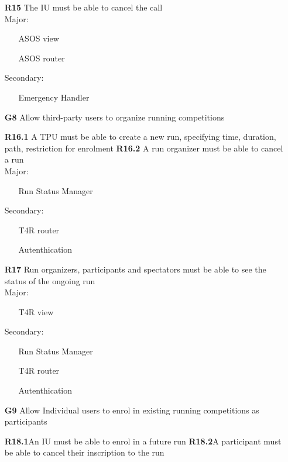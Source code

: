 \begin{itemize}
\subitem \textbf{R15} The IU must be able to cancel the call\\

Major:
\begin{itemize}
\item[\textbullet]ASOS view
\item[\textbullet]ASOS router
\end{itemize}
Secondary:
\begin{itemize}
\item[\textbullet] Emergency Handler
\end{itemize}

\item [\textbf{G8}] Allow third-party users to organize running competitions

\subitem \textbf{R16.1} A TPU must be able to create a new run, specifying time, duration, path, restriction for enrolment
\subitem \textbf{R16.2} A run organizer must be able to cancel a run \\

Major:
\begin{itemize}
\item[\textbullet]Run Status Manager
\end{itemize}
Secondary:
\begin{itemize}
\item[\textbullet]T4R router
\item[\textbullet]Autenthication
\end{itemize}

\subitem \textbf{R17} Run organizers, participants and spectators must be able to see the status of the ongoing run\\

Major:
\begin{itemize}
\item[\textbullet]T4R view
\end{itemize}
Secondary:
\begin{itemize}
\item[\textbullet]Run Status Manager
\item[\textbullet]T4R router
\item[\textbullet]Autenthication
\end{itemize}
\item [\textbf{G9}] Allow Individual users to enrol in existing running competitions as participants

\subitem \textbf{R18.1}An IU must be able to enrol in a future run
\subitem \textbf{R18.2}A participant must be able to cancel their inscription to the run \\


\end{itemize}

